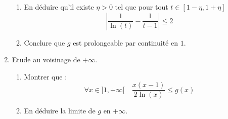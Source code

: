 \begin{exercice}
\begin{enumerate}
\begin{enumerate}
\item En déduire qu'il existe $\eta >0 $ tel que pour tout $t  \in [1-\eta, 1+\eta]$ 
$$\left|\frac{1}{\ln(t)} -\frac{1}{t-1}\right|\leq 2$$
\item Conclure  que $g$  est prolongeable par continuité en $1$. 
\end{enumerate}

\item Etude au voisinage de $+\infty$.
\begin{enumerate}
\item Montrer que :
$$\forall x\in ]1,+\infty[\quad \frac{x(x-1)}{2\ln(x)}\leq g(x)$$
\item En déduire la limite de $g$ en $+\infty$. 
\end{enumerate}
\end{enumerate}
\end{exercice}

